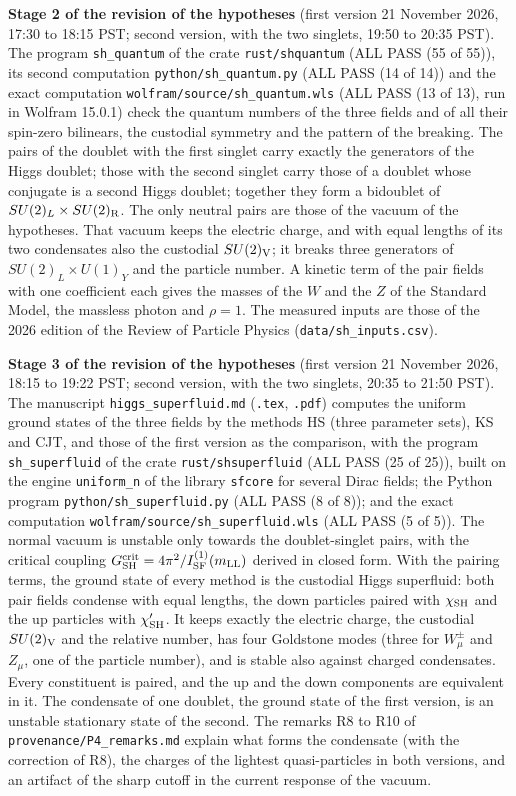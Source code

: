 \documentclass[
  10pt,
]{article}
\begin{document}
\textbf{Stage 2 of the revision of the hypotheses} (first version 21
November 2026, 17:30 to 18:15 PST; second version, with the two
singlets, 19:50 to 20:35 PST). The program \texttt{sh\_quantum} of the
crate \texttt{rust/shquantum} (ALL PASS (55 of 55)), its second
computation \texttt{python/sh\_quantum.py} (ALL PASS (14 of 14)) and the
exact computation \texttt{wolfram/source/sh\_quantum.wls} (ALL PASS (13
of 13), run in Wolfram 15.0.1) check the quantum numbers of the three
fields and of all their spin-zero bilinears, the custodial symmetry and
the pattern of the breaking. The pairs of the doublet with the first
singlet carry exactly the generators of the Higgs doublet; those with
the second singlet carry those of a doublet whose conjugate is a second
Higgs doublet; together they form a bidoublet of
\(SU(2)_L\times SU(2)_{\rm R}\). The only neutral pairs are those of the
vacuum of the hypotheses. That vacuum keeps the electric charge, and
with equal lengths of its two condensates also the custodial
\(SU(2)_{\rm V}\); it breaks three generators of
\(SU(2)_L\times U(1)_Y\) and the particle number. A kinetic term of the
pair fields with one coefficient each gives the masses of the \(W\) and
the \(Z\) of the Standard Model, the massless photon and \(\rho=1\). The
measured inputs are those of the 2026 edition of the Review of Particle
Physics (\texttt{data/sh\_inputs.csv}).

\textbf{Stage 3 of the revision of the hypotheses} (first version 21
November 2026, 18:15 to 19:22 PST; second version, with the two
singlets, 20:35 to 21:50 PST). The manuscript
\texttt{higgs\_superfluid.md} (\texttt{.tex}, \texttt{.pdf}) computes
the uniform ground states of the three fields by the methods HS (three
parameter sets), KS and CJT, and those of the first version as the
comparison, with the program \texttt{sh\_superfluid} of the crate
\texttt{rust/shsuperfluid} (ALL PASS (25 of 25)), built on the engine
\texttt{uniform\_n} of the library \texttt{sfcore} for several Dirac
fields; the Python program \texttt{python/sh\_superfluid.py} (ALL PASS
(8 of 8)); and the exact computation
\texttt{wolfram/source/sh\_superfluid.wls} (ALL PASS (5 of 5)). The
normal vacuum is unstable only towards the doublet-singlet pairs, with
the critical coupling
\(G^{\rm crit}_{\rm SH}=4\pi^2/I^{(1)}_{\rm SF}(m_{\rm LL})\) derived in
closed form. With the pairing terms, the ground state of every method is
the custodial Higgs superfluid: both pair fields condense with equal
lengths, the down particles paired with \(\chi_{\rm SH}\) and the up
particles with \(\chi'_{\rm SH}\). It keeps exactly the electric charge,
the custodial \(SU(2)_{\rm V}\) and the relative number, has four
Goldstone modes (three for \(W^\pm_\mu\) and \(Z_\mu\), one of the
particle number), and is stable also against charged condensates. Every
constituent is paired, and the up and the down components are equivalent
in it. The condensate of one doublet, the ground state of the first
version, is an unstable stationary state of the second. The remarks R8
to R10 of \texttt{provenance/P4\_remarks.md} explain what forms the
condensate (with the correction of R8), the charges of the lightest
quasi-particles in both versions, and an artifact of the sharp cutoff in
the current response of the vacuum.
\end{document}
